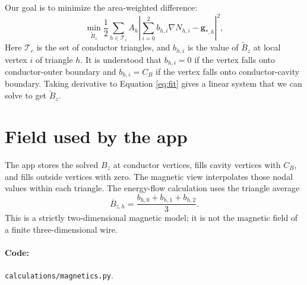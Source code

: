 \documentclass[11pt]{article}
\begin{document}
Our goal is to minimize the area-weighted
difference:
\begin{equation}
 \min_{\widetilde B_z}
 \frac12\sum_{h\in\mathcal T_c}A_h
 \left|\sum_{i=0}^2 b_{h,i}\nabla N_{h,i}-\bm g_{*,h}\right|^2,
 \label{eq:fit}
\end{equation}
Here $\mathcal T_c$ is the set of conductor triangles, and $b_{h,i}$
is the value of $\widetilde B_z$ at local vertex $i$ of triangle $h$.
It is understood that $b_{h,i}=0$ if the vertex falls onto conductor-outer
boundary and $b_{h,i}=C_B$ if the vertex falls onto conductor-cavity boundary.
Taking derivative to Equation \ref{eq:fit} gives a linear system that
we can solve to get $\widetilde B_z$.

\section{Field used by the app}
The app stores the solved $B_z$ at conductor vertices, fills
cavity vertices with $C_B$, and fills outside vertices with
zero. The magnetic view interpolates those nodal values
within each triangle. The energy-flow calculation uses the
triangle average
\begin{equation}
 \overline B_{z,h}=\frac{b_{h,0}+b_{h,1}+b_{h,2}}{3}.
\end{equation}
This is a strictly two-dimensional magnetic model; it is not
the magnetic field of a finite three-dimensional wire.

\paragraph{Code:} \texttt{calculations/magnetics.py}.
\end{document}
